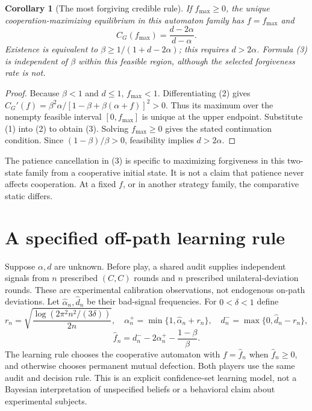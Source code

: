\documentclass[11pt,a4paper]{article}
\newtheorem{corollary}[theorem]{Corollary}
\theoremstyle{remark}
\begin{document}
\begin{corollary}[The most forgiving credible rule]
If $f_{\max}\ge0$, the unique cooperation-maximizing equilibrium in this automaton family has $f=f_{\max}$ and
\[
 C_G(f_{\max})=\frac{d-2\alpha}{d-\alpha}. \tag{3}
\]
Existence is equivalent to $\beta\ge1/(1+d-2\alpha)$; this requires $d>2\alpha$. Formula (3) is independent of $\beta$ within this feasible region, although the selected forgiveness rate is not.
\end{corollary}
\begin{proof}
Because $\beta<1$ and $d\le1$, $f_{\max}<1$. Differentiating (2) gives
$C_G'(f)=\beta^2\alpha/[1-\beta+\beta(\alpha+f)]^2>0$.
Thus its maximum over the nonempty feasible interval $[0,f_{\max}]$ is unique at the upper endpoint. Substitute (1) into (2) to obtain (3). Solving $f_{\max}\ge0$ gives the stated continuation condition. Since $(1-\beta)/\beta>0$, feasibility implies $d>2\alpha$.
\end{proof}
The patience cancellation in (3) is specific to maximizing forgiveness in this two-state family from a cooperative initial state. It is not a claim that patience never affects cooperation. At a fixed $f$, or in another strategy family, the comparative static differs.

\section{A specified off-path learning rule}
Suppose $\alpha,d$ are unknown. Before play, a shared audit supplies independent signals from $n$ prescribed $(C,C)$ rounds and $n$ prescribed unilateral-deviation rounds. These are experimental calibration observations, not endogenous on-path deviations. Let $\widehat\alpha_n,\widehat d_n$ be their bad-signal frequencies. For $0<\delta<1$ define
\[
 r_n=\sqrt{\frac{\log(2\pi^2n^2/(3\delta))}{2n}},\quad
 \alpha_n^+=\min\{1,\widehat\alpha_n+r_n\},\quad
 d_n^-=\max\{0,\widehat d_n-r_n\},
\]
\[
 \widehat f_n=d_n^--2\alpha_n^+-\frac{1-\beta}{\beta}.
\]
The learning rule chooses the cooperative automaton with $f=\widehat f_n$ when $\widehat f_n\ge0$, and otherwise chooses permanent mutual defection. Both players use the same audit and decision rule. This is an explicit confidence-set learning model, not a Bayesian interpretation of unspecified beliefs or a behavioral claim about experimental subjects.
\end{document}
